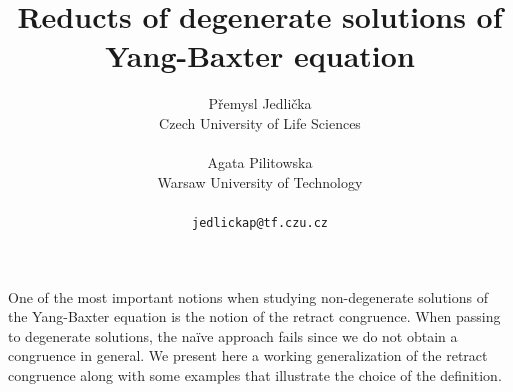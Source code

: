 \documentclass[a4paper]{article} %
\date{} %
\begin{document}
\setcounter{page}{1} %

\title{Reducts of degenerate solutions of Yang-Baxter equation}

\author{Přemysl Jedlička \\ %
       Czech University of Life Sciences\\ \\ %
       Agata Pilitowska \\ %
       Warsaw University of Technology\\ \\ %
       \texttt{jedlickap@tf.czu.cz} %
       }%

\maketitle


One of the most important notions when studying non-degenerate solutions of the Yang-Baxter equation is the notion
of the retract congruence. When passing to degenerate solutions, the naïve approach fails since we do not obtain a congruence in general.
We present here a working generalization
of the retract congruence along with some examples that illustrate the choice of the definition.
\end{document}
